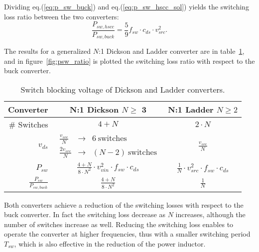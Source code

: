 Dividing eq.(\ref{eq:p_sw_buck}) and eq.(\ref{eq:p_sw_hscc_sol}) yields the switching loss ratio between the two converters:
\begin{equation}
\frac{P_{sw,hscc}}{P_{sw,buck}} =  \frac{5}{9}  f_{sw} \cdot c_{ds} \cdot v_{src}^2.
\label{eq:p_sw_hscc_sol}
\end{equation}

The results for a generalized $N$:1 Dickson and Ladder converter are in table~\ref{tab:Dick_Ladder_v_blk}, and in figure~\ref{fig:psw_ratio} is plotted the switching loss ratio with respect to the buck converter.
\begin{table}[h]
\centering
\caption{Switch blocking voltage of Dickson and Ladder converters.}
\label{tab:Dick_Ladder_v_blk}
\renewcommand{\arraystretch}{1.5}%
\begin{tabular}{r | c  c   }
 Converter &  N:1 Dickson  $ N \geq$ 3  &  N:1 Ladder $ N \geq 2$  \\
 \midrule
\# Switches & $ 4 + N $  & $2 \cdot N$ \\
 $v_{ds}$ & $\begin{array} {rcl} \frac{v_{src}}{N}   & \to &  6~ \text{switches} \\
                                           \frac{2 v_{src}}{N} & \to &  (N - 2) ~\text{switches}
                       \end{array}$
                       &   $ \frac{v_{src}}{N} $ \\
 $ P_{sw}$ &  $ \frac{4+N}{8 \cdot N^2} \cdot v_{vin}^2 \cdot f_{sw}  \cdot {c_{ds}} $ &  $ \frac{1}{ N} \cdot v_{src}^2 \cdot f_{sw} \cdot {c_{ds}} $  \\
 $ \frac{P_{sw}}{P_{sw,buck}}$ &  $ \frac{4+N}{8 \cdot N^2}  $ &  $ \frac{1}{ N}  $  \\


 \end{tabular}
\end{table}

Both converters achieve a reduction of the switching losses with respect to the buck converter. In fact the switching loss decrease as $N$ increases, although the number of switches increase as well. Reducing the switching loss enables to operate the converter at higher frequencies, thus with a smaller switching period $T_{sw}$, which is also effective in the reduction of the power inductor.

